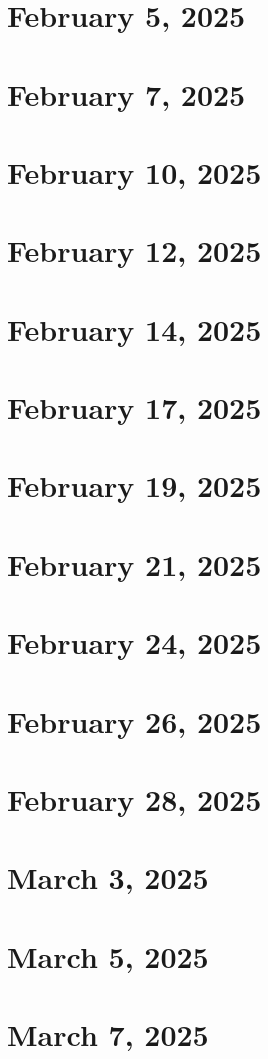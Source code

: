 \documentclass[11pt]{article} \usepackage{lindrew}
\begin{document}
\section{February 5, 2025}
\section{February 7, 2025}
\section{February 10, 2025}
\section{February 12, 2025}
\section{February 14, 2025}
\section{February 17, 2025}
\section{February 19, 2025}
\section{February 21, 2025}
\section{February 24, 2025}
\section{February 26, 2025}
\section{February 28, 2025}
\section{March 3, 2025}
\section{March 5, 2025}
\section{March 7, 2025}
\end{document}

